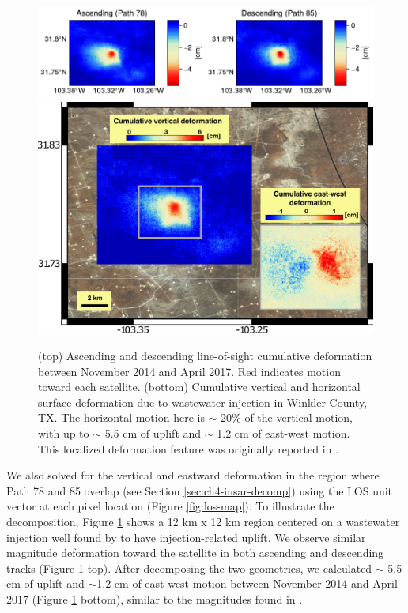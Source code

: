 \begin{figure}
	\centering
	\includegraphics[width=.9\textwidth]{figures/chapter2-sar/injection-asc-desc.pdf}
	\includegraphics[width=.8\textwidth]{figures/chapter2-sar/injection-kim-lu}
	\caption[Vertical and horizontal deformation near Winkler County, TX]{
		(top) Ascending and descending line-of-sight cumulative deformation between November 2014 and April 2017. Red indicates motion toward each satellite.
		(bottom) Cumulative vertical and horizontal surface deformation due to wastewater injection in Winkler County, TX. The horizontal motion here is $\sim$ 20\% of the vertical motion, with up to $\sim$ 5.5 cm of uplift and $\sim$ 1.2 cm of east-west motion. This localized deformation feature was originally reported in \cite{Kim2018AssociationLocalizedGeohazards}.}
	\label{fig:ch2-injection-kim-lu}
\end{figure}


We also solved for the vertical and eastward deformation in the region where Path 78 and 85 overlap (see Section \ref{sec:ch4-insar-decomp}) using the LOS unit vector at each pixel location (Figure \ref{fig:los-map}).
To illustrate the decomposition, Figure \ref{fig:ch2-injection-kim-lu} shows a 12 km x 12 km region centered on a wastewater injection well found by \cite{Kim2018AssociationLocalizedGeohazards} to have injection-related uplift. We observe similar magnitude deformation toward the satellite in both ascending and descending tracks (Figure \ref{fig:ch2-injection-kim-lu} top). 
After decomposing the two geometries, we calculated $\sim$ 5.5 cm of uplift and $\sim$1.2 cm of east-west motion between November 2014 and April 2017 (Figure \ref{fig:ch2-injection-kim-lu} bottom), similar to the magnitudes found in \cite{Kim2018AssociationLocalizedGeohazards}.

